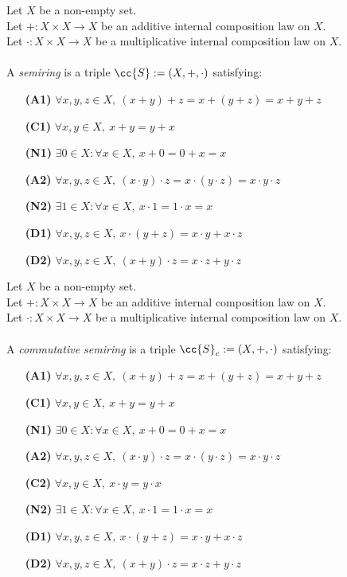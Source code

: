 \begin{definition-pre}[Semiring]
    \label{def:semiring}
    Let $X$ be a non-empty set. \\
    Let $+: X\times X \to X$ be an additive internal composition law on $X$. \\
    Let $\cdot: X\times X \to X$ be a multiplicative internal composition law on $X$. \\\\
    A \textit{semiring} is a triple $\cc{S}:= (X, +, \cdot)$ satisfying:
    \begin{enumerate}
        \item [\textbf{(A1)}] $\forall x,y,z\in X,\ (x+y)+z= x+(y+z) = x+y+z$
        \item [\textbf{(C1)}] $\forall x,y\in X,\ x+y = y+x$
        \item [\textbf{(N1)}] $\exists 0 \in X : \forall x \in X,\ x+0 = 0+x = x$
        \item [\textbf{(A2)}] $\forall x,y,z\in X,\ (x\cdot y)\cdot z= x\cdot(y\cdot z) = x\cdot y\cdot z$
        \item [\textbf{(N2)}] $\exists 1 \in X : \forall x \in X,\ x\cdot1 = 1\cdot x = x$
        \item [\textbf{(D1)}] $\forall x,y,z \in X,\ x\cdot(y+z)=x\cdot y+x\cdot z$
        \item [\textbf{(D2)}] $\forall x,y,z \in X,\ (x+y)\cdot z=x\cdot z+y\cdot z$
    \end{enumerate}
\end{definition-pre}
\begin{definition-pre}
    \label{def:commutative_semiring}
    Let $X$ be a non-empty set. \\
    Let $+: X\times X \to X$ be an additive internal composition law on $X$. \\
    Let $\cdot: X\times X \to X$ be a multiplicative internal composition law on $X$. \\\\
    A \textit{commutative semiring} is a triple $\cc{S}_c:= (X, +, \cdot)$ satisfying:
    \begin{enumerate}
        \item [\textbf{(A1)}] $\forall x,y,z\in X,\ (x+y)+z= x+(y+z) = x+y+z$
        \item [\textbf{(C1)}] $\forall x,y\in X,\ x+y = y+x$
        \item [\textbf{(N1)}] $\exists 0 \in X : \forall x \in X,\ x+0 = 0+x = x$
        \item [\textbf{(A2)}] $\forall x,y,z\in X,\ (x\cdot y)\cdot z= x\cdot(y\cdot z) = x\cdot y\cdot z$
        \item [\textbf{(C2)}] $\forall x,y\in X,\ x\cdot y = y\cdot x$
        \item [\textbf{(N2)}] $\exists 1 \in X : \forall x \in X,\ x\cdot1 = 1\cdot x = x$
        \item [\textbf{(D1)}] $\forall x,y,z \in X,\ x\cdot(y+z)=x\cdot y+x\cdot z$
        \item [\textbf{(D2)}] $\forall x,y,z \in X,\ (x+y)\cdot z=x\cdot z+y\cdot z$
    \end{enumerate}
\end{definition-pre}

